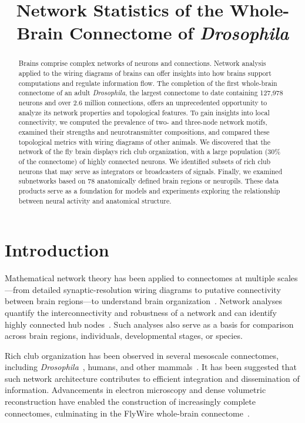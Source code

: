 \documentclass[11pt]{article}
\title{Network Statistics of the Whole-Brain Connectome of \textit{Drosophila}}
\author{}
\date{}
\begin{document}
\maketitle

\begin{abstract}
Brains comprise complex networks of neurons and connections. Network analysis applied to the wiring diagrams of brains can offer insights into how brains support computations and regulate information flow. The completion of the first whole-brain connectome of an adult \textit{Drosophila}, the largest connectome to date containing 127,978 neurons and over 2.6 million connections, offers an unprecedented opportunity to analyze its network properties and topological features. To gain insights into local connectivity, we computed the prevalence of two- and three-node network motifs, examined their strengths and neurotransmitter compositions, and compared these topological metrics with wiring diagrams of other animals. We discovered that the network of the fly brain displays rich club organization, with a large population (30\% of the connectome) of highly connected neurons. We identified subsets of rich club neurons that may serve as integrators or broadcasters of signals. Finally, we examined subnetworks based on 78 anatomically defined brain regions or neuropils. These data products serve as a foundation for models and experiments exploring the relationship between neural activity and anatomical structure.
\end{abstract}

\section{Introduction}

Mathematical network theory has been applied to connectomes at multiple scales---from detailed synaptic-resolution wiring diagrams to putative connectivity between brain regions---to understand brain organization~\citep{sporns2005human,varshney2011structural}. Network analyses quantify the interconnectivity and robustness of a network and can identify highly connected hub nodes~\citep{vandenheuvel2011rich,zamora2020rich}. Such analyses also serve as a basis for comparison across brain regions, individuals, developmental stages, or species.

Rich club organization has been observed in several mesoscale connectomes, including \textit{Drosophila}~\citep{shih2015connectomics,worrell2017optimized}, humans, and other mammals~\citep{vandenheuvel2011rich,zamora2020rich}. It has been suggested that such network architecture contributes to efficient integration and dissemination of information. Advancements in electron microscopy and dense volumetric reconstruction have enabled the construction of increasingly complete connectomes, culminating in the FlyWire whole-brain connectome~\citep{dorkenwald2022flywire,dorkenwald2023neuronal,schlegel2023consensus}.
\end{document}
